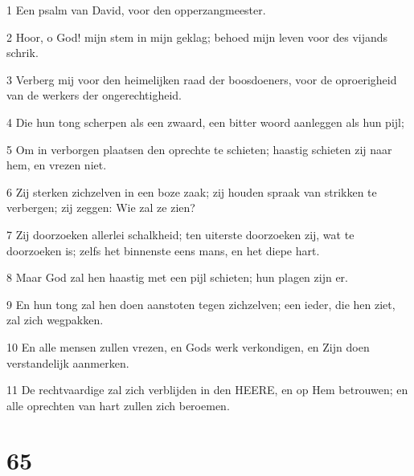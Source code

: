 \par 1 Een psalm van David, voor den opperzangmeester.
\par 2 Hoor, o God! mijn stem in mijn geklag; behoed mijn leven voor des vijands schrik.
\par 3 Verberg mij voor den heimelijken raad der boosdoeners, voor de oproerigheid van de werkers der ongerechtigheid.
\par 4 Die hun tong scherpen als een zwaard, een bitter woord aanleggen als hun pijl;
\par 5 Om in verborgen plaatsen den oprechte te schieten; haastig schieten zij naar hem, en vrezen niet.
\par 6 Zij sterken zichzelven in een boze zaak; zij houden spraak van strikken te verbergen; zij zeggen: Wie zal ze zien?
\par 7 Zij doorzoeken allerlei schalkheid; ten uiterste doorzoeken zij, wat te doorzoeken is; zelfs het binnenste eens mans, en het diepe hart.
\par 8 Maar God zal hen haastig met een pijl schieten; hun plagen zijn er.
\par 9 En hun tong zal hen doen aanstoten tegen zichzelven; een ieder, die hen ziet, zal zich wegpakken.
\par 10 En alle mensen zullen vrezen, en Gods werk verkondigen, en Zijn doen verstandelijk aanmerken.
\par 11 De rechtvaardige zal zich verblijden in den HEERE, en op Hem betrouwen; en alle oprechten van hart zullen zich beroemen.

\chapter{65}

